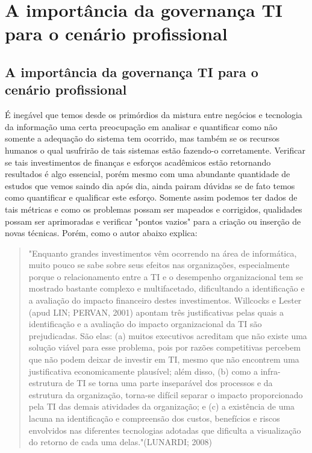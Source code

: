 \chapter{A importância da governança TI para o cenário profissional}
\section{A importância da governança TI para o cenário profissional}
É inegável que temos desde os primórdios da mistura entre negócios e tecnologia da informação uma certa preocupação em analisar e quantificar como não somente a adequação do sistema tem ocorrido, mas também se os recursos humanos o qual usufrirão de tais sistemas estão fazendo-o corretamente. Verificar se tais investimentos de finanças e esforços acadêmicos estão retornando resultados é algo essencial, porém mesmo com uma abundante quantidade de estudos que vemos saindo dia após dia, ainda pairam dúvidas se de fato temos como quantificar e qualificar este esforço. Somente assim podemos ter dados de tais métricas e como os problemas possam ser mapeados e corrigidos, qualidades possam ser aprimoradas e verificar "pontos vazios" para a criação ou inserção de novas técnicas.  Porém, como o autor abaixo explica:
\begin{quotation}

    "Enquanto grandes investimentos vêm ocorrendo na área de informática, muito pouco se sabe sobre seus efeitos nas organizações, especialmente porque o relacionamento entre a TI e o desempenho organizacional tem se mostrado bastante complexo e multifacetado, dificultando a identificação e a avaliação do impacto financeiro destes investimentos. Willcocks e Lester (apud LIN; PERVAN, 2001\cite{LIN}) apontam três justificativas pelas quais a identificação e a avaliação do impacto organizacional da TI são prejudicadas. São elas: (a) muitos executivos acreditam que não existe uma solução viável para esse problema, pois por razões competitivas percebem que não podem deixar de investir em TI, mesmo que não encontrem uma justificativa economicamente plausível; além disso, (b) como a infra-estrutura de TI se torna uma parte inseparável dos processos e da estrutura da organização, torna-se difícil separar o impacto proporcionado pela TI das demais atividades da organização; e (c) a existência de uma lacuna na identificação e compreensão dos custos, benefícios e riscos envolvidos nas diferentes tecnologias adotadas que dificulta a visualização do retorno de cada uma delas."(LUNARDI; 2008)\cite{ESTUDO-EMPIRICO}


\end{quotation}    
    
